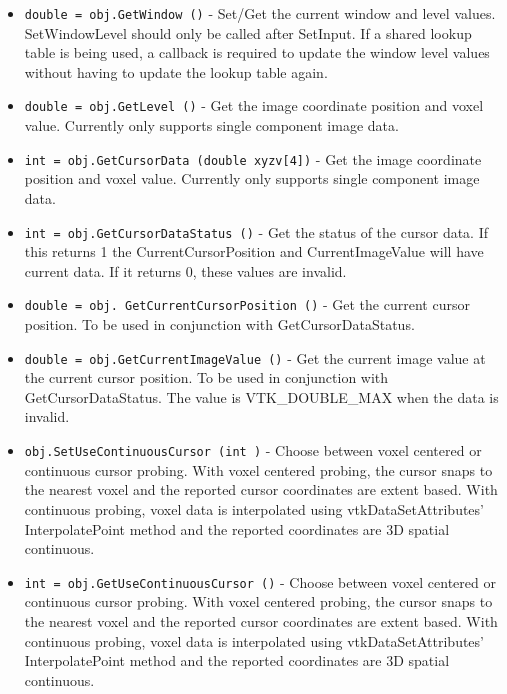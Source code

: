\begin{itemize}
\item  \verb|double = obj.GetWindow ()| -  Set/Get the current window and level values.  SetWindowLevel should
 only be called after SetInput.  If a shared lookup table is being used,
 a callback is required to update the window level values without having
 to update the lookup table again.

\item  \verb|double = obj.GetLevel ()| -  Get the image coordinate position and voxel value.  Currently only
 supports single component image data.

\item  \verb|int = obj.GetCursorData (double xyzv[4])| -  Get the image coordinate position and voxel value.  Currently only
 supports single component image data.

\item  \verb|int = obj.GetCursorDataStatus ()| -  Get the status of the cursor data.  If this returns 1 the
 CurrentCursorPosition and CurrentImageValue will have current
 data.  If it returns 0, these values are invalid.

\item  \verb|double = obj. GetCurrentCursorPosition ()| -  Get the current cursor position.  To be used in conjunction with
 GetCursorDataStatus.

\item  \verb|double = obj.GetCurrentImageValue ()| -  Get the current image value at the current cursor position.  To
 be used in conjunction with GetCursorDataStatus.  The value is
 VTK\_DOUBLE\_MAX when the data is invalid.

\item  \verb|obj.SetUseContinuousCursor (int )| -  Choose between voxel centered or continuous cursor probing.  With voxel
 centered probing, the cursor snaps to the nearest voxel and the reported
 cursor coordinates are extent based.  With continuous probing, voxel data
 is interpolated using vtkDataSetAttributes' InterpolatePoint method and
 the reported coordinates are 3D spatial continuous.

\item  \verb|int = obj.GetUseContinuousCursor ()| -  Choose between voxel centered or continuous cursor probing.  With voxel
 centered probing, the cursor snaps to the nearest voxel and the reported
 cursor coordinates are extent based.  With continuous probing, voxel data
 is interpolated using vtkDataSetAttributes' InterpolatePoint method and
 the reported coordinates are 3D spatial continuous.


\end{itemize}
